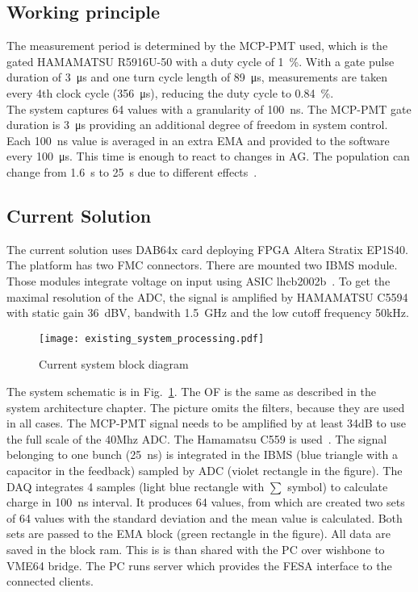 \subsection{Working principle}
The measurement period is determined by the MCP-PMT used, which is the gated
HAMAMATSU R5916U-50 with a duty cycle of \SI{1}{\%}. With a gate pulse duration
of \SI{3}{\micro\second} and one turn cycle length of \SI{89}{\micro\second},
measurements are taken every 4th clock cycle (\SI{356}{\micro\second}),
reducing the duty cycle to \SI{0.84}{\%}.\\
The system captures 64 values with a granularity of \SI{100}{\nano\second}. The
MCP-PMT gate duration is \SI{3}{\micro\second} providing an additional degree of
freedom in system control. Each \SI{100}{\nano\second} value is averaged in an
extra EMA and provided to the software every \SI{100}{\micro\second}. This
time is enough to react to changes in AG. The population can change from
\SI{1.6}{\second} to \SI{25}{\second} due to different
effects~\cite{high_sensitivity_measurement}.

\subsection{Current Solution}
The current solution uses DAB64x card deploying FPGA Altera Stratix EP1S40. The
platform has two FMC connectors. There are mounted two IBMS module. Those
modules integrate voltage on input using ASIC lhcb2002b~\cite{lhcb_asic}.
To get the maximal resolution of the ADC, the signal is amplified by HAMAMATSU
C5594 with static gain \SI{36}{dBV}, bandwith \SI{1.5}{GHz} and the low cutoff
frequency 50kHz.
\begin{figure}[!tbh]
    \centering
    \texttt{[image: existing\_system\_processing.pdf]}
    \caption{Current system block diagram}
    \label{fig:current_system_processing}
\end{figure}
The system schematic is in Fig.~\ref{fig:current_system_processing}. The OF is
the same as described in the system architecture chapter. The picture omits the
filters, because they are used in all cases. The MCP-PMT signal needs to be
amplified by at least 34dB to use the full scale of the 40Mhz ADC. The
Hamamatsu C559 is used~\cite{bsra_first_operation}. The signal belonging
to one bunch (\SI{25}{ns}) is integrated in the IBMS (blue triangle with a
capacitor in the feedback) sampled by ADC (violet rectangle in the figure). The
DAQ integrates 4 samples (light blue rectangle with $\sum$ symbol) to calculate
charge in \SI{100}{ns} interval. It produces 64 values, from which are created
two sets of 64 values with the standard deviation and the mean value is
calculated. Both sets are passed to the EMA block (green rectangle in
the figure). All data are saved in the block ram. This is is than shared with
the PC over wishbone to VME64 bridge. The PC runs server which provides the
FESA interface to the connected clients. 

